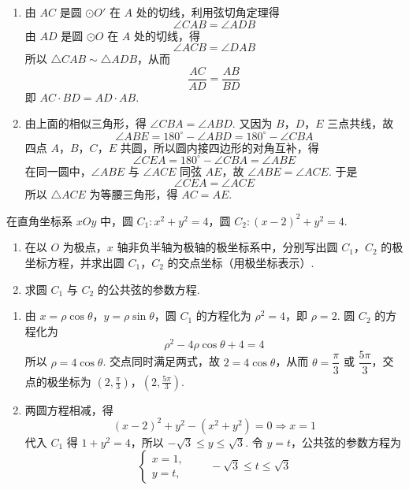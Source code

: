 \begin{solution}
\begin{enumerate}
\item 由 \(AC\) 是圆 \(\odot O'\) 在 \(A\) 处的切线，利用弦切角定理得
\[
\angle CAB=\angle ADB
\]
由 \(AD\) 是圆 \(\odot O\) 在 \(A\) 处的切线，得
\[
\angle ACB=\angle DAB
\]
所以 \(\triangle CAB\sim\triangle ADB\)，从而
\[
\frac{AC}{AD}=\frac{AB}{BD}
\]
即 \(AC\cdot BD=AD\cdot AB\).
\item 由上面的相似三角形，得 \(\angle CBA=\angle ABD\). 又因为 \(B\)，\(D\)，\(E\) 三点共线，故
\[
\angle ABE=180^\circ-\angle ABD=180^\circ-\angle CBA
\]
四点 \(A\)，\(B\)，\(C\)，\(E\) 共圆，所以圆内接四边形的对角互补，得
\[
\angle CEA=180^\circ-\angle CBA=\angle ABE
\]
在同一圆中，\(\angle ABE\) 与 \(\angle ACE\) 同弦 \(AE\)，故 \(\angle ABE=\angle ACE\). 于是
\[
\angle CEA=\angle ACE
\]
所以 \(\triangle ACE\) 为等腰三角形，得 \(AC=AE\).
\end{enumerate}
\end{solution}

\begin{problem}
在直角坐标系 \(xOy\) 中，圆 \(C_1: x^2 + y^2 = 4\)，圆 \(C_2: (x - 2)^2 + y^2 = 4\).

\begin{enumerate}
\item 在以 \(O\) 为极点，\(x\) 轴非负半轴为极轴的极坐标系中，分别写出圆 \(C_{1}\)，\(C_{2}\) 的极坐标方程，并求出圆 \(C_{1}\)，\(C_{2}\) 的交点坐标（用极坐标表示）.
\item 求圆 \(C_{1}\) 与 \(C_{2}\) 的公共弦的参数方程.
\end{enumerate}
\end{problem}

\begin{solution}
\begin{enumerate}
\item 由 \(x=\rho\cos\theta\)，\(y=\rho\sin\theta\)，圆 \(C_1\) 的方程化为 \(\rho^2=4\)，即 \(\rho=2\). 圆 \(C_2\) 的方程化为
\[
\rho^2-4\rho\cos\theta+4=4
\]
所以 \(\rho=4\cos\theta\). 交点同时满足两式，故 \(2=4\cos\theta\)，从而 \(\theta=\dfrac\pi3\) 或 \(\dfrac{5\pi}3\)，交点的极坐标为
\(\left(2,\frac\pi3\right)\)，\(\left(2,\frac{5\pi}3\right)\).
\item 两圆方程相减，得
\[
\left(x-2\right)^2+y^2-(x^2+y^2)=0\Longrightarrow x=1
\]
代入 \(C_1\) 得 \(1+y^2=4\)，所以 \(-\sqrt3\leqslant y\leqslant\sqrt3\). 令 \(y=t\)，公共弦的参数方程为
\[
\begin{cases}
x=1,\\
y=t,
\end{cases}
\qquad -\sqrt{3}\leqslant t\leqslant\sqrt{3}
\]
\end{enumerate}
\end{solution}


